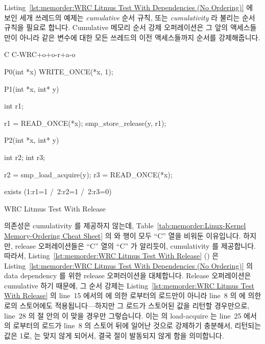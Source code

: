 Listing~\ref{lst:memorder:WRC Litmus Test With Dependencies (No Ordering)}
에 보인 세개 쓰레드의 예제는 \emph{cumulative} 순서 규칙, 또는
\emph{cumulativity} 라 불리는 순서 규칙을 필요로 합니다.
Cumulative 메모리 순서 강제 오퍼레이션은 그 앞의 액세스들만이 아니라 같은
변수에 대한 모든 쓰레드의 이전 액세스들까지 순서를 강제해줍니다.

\begin{listing}[tbp]
{ \scriptsize
\begin{verbbox}[\LstLineNo]
C C-WRC+o+o-r+a-o

{
}

P0(int *x)
{
  WRITE_ONCE(*x, 1);
}

P1(int *x, int* y)
{
  int r1;

  r1 = READ_ONCE(*x);
  smp_store_release(y, r1);
}

P2(int *x, int* y)
{
  int r2;
  int r3;

  r2 = smp_load_acquire(y);
  r3 = READ_ONCE(*x);
}

exists (1:r1=1 /\ 2:r2=1 /\ 2:r3=0)
\end{verbbox}
}
\centering
\theverbbox
\caption{WRC Litmus Test With Release}
\label{lst:memorder:WRC Litmus Test With Release}
\end{listing}

의존성은 cumulativity 를 제공하지 않는데,
Table~\ref{tab:memorder:Linux-Kernel Memory-Ordering Cheat Sheet} 의
 와  행이 모두 ``C'' 열을 비워둔
이유입니다.
하지만, release 오퍼레이션들은 ``C'' 열의 ``C'' 가 알리듯이, cumulativity 를
제공합니다.
따라서,
Listing~\ref{lst:memorder:WRC Litmus Test With Release}
()
은
Listing~\ref{lst:memorder:WRC Litmus Test With Dependencies (No Ordering)}
의 data dependency 를 위한 release 오퍼러이션을 대체합니다.
Release 오퍼레이션은 cumulative 하기 때문에, 그 순서 강제는
Listing~\ref{lst:memorder:WRC Litmus Test With Release} 의 line~15 에서의
 에 의한  로부터의 로드만이 아니라 line~8 의  에 의한
 로의 스토어에도 적용됩니다---하지만 그 로드가 스토어된 값을 리턴할
경우만으로, line~28 의  절 안의  이 맞을 경우만
그렇습니다.
이는  의 load-acquire 는 line~25 에서의  로부터의 로드가 line~8
의 스토어 뒤에 일어난 것으로 강제하기 충분해서, 리턴되는 값은 1로, 
는 맞지 않게 되어서, 결국  절이 발동되지 않게 함을 의미합니다.
\iffalse

